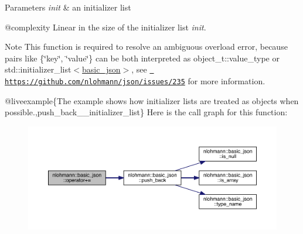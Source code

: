 \begin{DoxyParams}{Parameters}
{\em init} & an initializer list\\
\hline
\end{DoxyParams}
@complexity Linear in the size of the initializer list {\itshape init}.

\begin{DoxyNote}{Note}
This function is required to resolve an ambiguous overload error, because pairs like {\ttfamily \{\char`\"{}key\char`\"{}, \char`\"{}value\char`\"{}\}} can be both interpreted as {\ttfamily object\+\_\+t\+::value\+\_\+type} or {\ttfamily std\+::initializer\+\_\+list$<$\mbox{\hyperlink{classnlohmann_1_1basic__json}{basic\+\_\+json}}$>$}, see \href{https://github.com/nlohmann/json/issues/235}{\texttt{ https\+://github.\+com/nlohmann/json/issues/235}} for more information.
\end{DoxyNote}
@liveexample\{The example shows how initializer lists are treated as objects when possible.,push\+\_\+back\+\_\+\+\_\+initializer\+\_\+list\} Here is the call graph for this function\+:\nopagebreak
\begin{figure}[H]
\begin{center}
\leavevmode
\includegraphics[width=350pt]{classnlohmann_1_1basic__json_a0cf23e7d44e78bb9014484971af2f40f_cgraph}
\end{center}
\end{figure}
\mbox{\label{classnlohmann_1_1basic__json_aab256df8c5594ec693035822fa1e2904}} 
